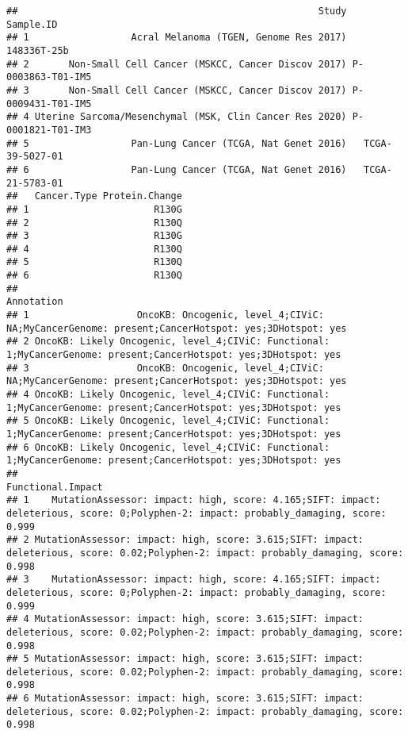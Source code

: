 \documentclass[
]{article}
\begin{document}
\begin{verbatim}
##                                                     Study         Sample.ID
## 1                  Acral Melanoma (TGEN, Genome Res 2017)       148336T-25b
## 2       Non-Small Cell Cancer (MSKCC, Cancer Discov 2017) P-0003863-T01-IM5
## 3       Non-Small Cell Cancer (MSKCC, Cancer Discov 2017) P-0009431-T01-IM5
## 4 Uterine Sarcoma/Mesenchymal (MSK, Clin Cancer Res 2020) P-0001821-T01-IM3
## 5                  Pan-Lung Cancer (TCGA, Nat Genet 2016)   TCGA-39-5027-01
## 6                  Pan-Lung Cancer (TCGA, Nat Genet 2016)   TCGA-21-5783-01
##   Cancer.Type Protein.Change
## 1                      R130G
## 2                      R130Q
## 3                      R130G
## 4                      R130Q
## 5                      R130Q
## 6                      R130Q
##                                                                                                         Annotation
## 1                   OncoKB: Oncogenic, level_4;CIViC: NA;MyCancerGenome: present;CancerHotspot: yes;3DHotspot: yes
## 2 OncoKB: Likely Oncogenic, level_4;CIViC: Functional: 1;MyCancerGenome: present;CancerHotspot: yes;3DHotspot: yes
## 3                   OncoKB: Oncogenic, level_4;CIViC: NA;MyCancerGenome: present;CancerHotspot: yes;3DHotspot: yes
## 4 OncoKB: Likely Oncogenic, level_4;CIViC: Functional: 1;MyCancerGenome: present;CancerHotspot: yes;3DHotspot: yes
## 5 OncoKB: Likely Oncogenic, level_4;CIViC: Functional: 1;MyCancerGenome: present;CancerHotspot: yes;3DHotspot: yes
## 6 OncoKB: Likely Oncogenic, level_4;CIViC: Functional: 1;MyCancerGenome: present;CancerHotspot: yes;3DHotspot: yes
##                                                                                                                         Functional.Impact
## 1    MutationAssessor: impact: high, score: 4.165;SIFT: impact: deleterious, score: 0;Polyphen-2: impact: probably_damaging, score: 0.999
## 2 MutationAssessor: impact: high, score: 3.615;SIFT: impact: deleterious, score: 0.02;Polyphen-2: impact: probably_damaging, score: 0.998
## 3    MutationAssessor: impact: high, score: 4.165;SIFT: impact: deleterious, score: 0;Polyphen-2: impact: probably_damaging, score: 0.999
## 4 MutationAssessor: impact: high, score: 3.615;SIFT: impact: deleterious, score: 0.02;Polyphen-2: impact: probably_damaging, score: 0.998
## 5 MutationAssessor: impact: high, score: 3.615;SIFT: impact: deleterious, score: 0.02;Polyphen-2: impact: probably_damaging, score: 0.998
## 6 MutationAssessor: impact: high, score: 3.615;SIFT: impact: deleterious, score: 0.02;Polyphen-2: impact: probably_damaging, score: 0.998

\end{verbatim}
\end{document}
